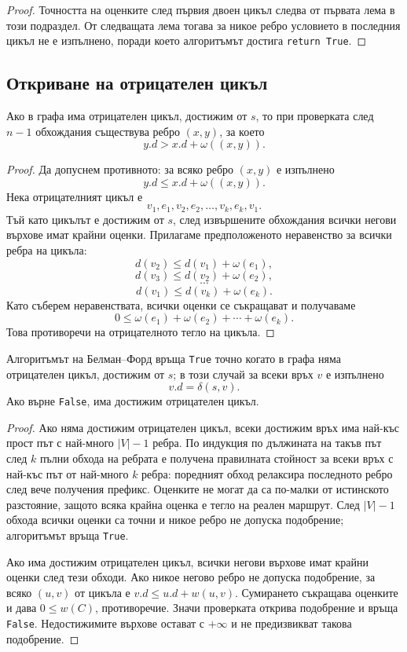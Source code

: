 \begin{proof}
Точността на оценките след първия двоен цикъл следва от първата лема в този подраздел. От следващата лема тогава за никое ребро условието в последния цикъл не е изпълнено, поради което алгоритъмът достига \texttt{return True}.
\end{proof}

\subsection{Откриване на отрицателен цикъл}\label{s:8.5.3}

\begin{lem}
Ако в графа има отрицателен цикъл, достижим от $s$, то при проверката след $n-1$ обхождания съществува ребро $(x,y)$, за което
\[
y.d>x.d+\omega((x,y)).
\]
\end{lem}

\begin{proof}
Да допуснем противното: за всяко ребро $(x,y)$ е изпълнено
\[
y.d\leq x.d+\omega((x,y)).
\]
Нека отрицателният цикъл е
\[
v_1,e_1,v_2,e_2,\ldots,v_k,e_k,v_1.
\]
Тъй като цикълът е достижим от $s$, след извършените обхождания всички негови върхове имат крайни оценки. Прилагаме предположеното неравенство за всички ребра на цикъла:
\[
d(v_2)\leq d(v_1)+\omega(e_1),
\]
\[
d(v_3)\leq d(v_2)+\omega(e_2),
\]
\[
\cdots
\]
\[
d(v_1)\leq d(v_k)+\omega(e_k).
\]
Като съберем неравенствата, всички оценки се съкращават и получаваме
\[
0\leq \omega(e_1)+\omega(e_2)+\cdots+\omega(e_k).
\]
Това противоречи на отрицателното тегло на цикъла.
\end{proof}

\begin{keythm}
Алгоритъмът на Белман--Форд връща \texttt{True} точно когато в графа няма отрицателен цикъл, достижим от $s$; в този случай за всеки връх $v$ е изпълнено
\[
v.d=\delta(s,v).
\]
Ако върне \texttt{False}, има достижим отрицателен цикъл.
\end{keythm}

\begin{proof}
Ако няма достижим отрицателен цикъл, всеки достижим връх има най-къс прост път с най-много $|V|-1$ ребра. По индукция по дължината на такъв път след $k$ пълни обхода на ребрата е получена правилната стойност за всеки връх с най-къс път от най-много $k$ ребра: поредният обход релаксира последното ребро след вече получения префикс. Оценките не могат да са по-малки от истинското разстояние, защото всяка крайна оценка е тегло на реален маршрут. След $|V|-1$ обхода всички оценки са точни и никое ребро не допуска подобрение; алгоритъмът връща \texttt{True}.

Ако има достижим отрицателен цикъл, всички негови върхове имат крайни оценки след тези обходи. Ако никое негово ребро не допуска подобрение, за всяко $(u,v)$ от цикъла е $v.d\le u.d+w(u,v)$. Сумирането съкращава оценките и дава $0\le w(C)$, противоречие. Значи проверката открива подобрение и връща \texttt{False}. Недостижимите върхове остават с $+\infty$ и не предизвикват такова подобрение.
\end{proof}

